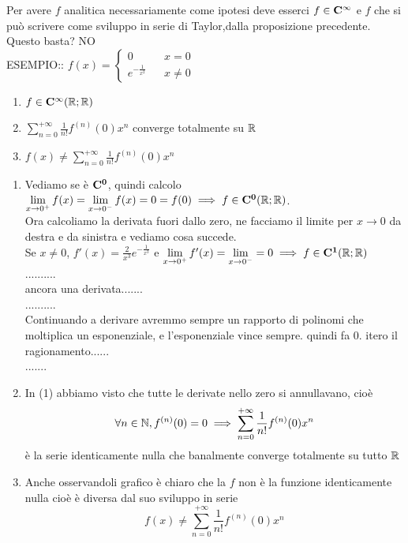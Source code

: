 Per avere $f$ analitica  necessariamente come ipotesi deve esserci $f\in \mathbf{C^{\infty}}$ e $f$ che si può scrivere come sviluppo in serie di Taylor,dalla proposizione precedente. Questo basta? NO\\
ESEMPIO:: $f(x)=\left\{\begin{matrix}0&& x=0\\e^{-\frac{1}{x^2}}&&x\ne 0\end{matrix}\right.$
\begin{center}
	\begin{tikzpicture}[scale=1]
	\end{tikzpicture}
\end{center}
\begin{enumerate}
	\item $f\in \mathbf{C^{\infty}}( \mathbb{R}; \mathbb{R})$
	\item $\sum\limits_{n=0}^{+\infty}\frac{1}{n!}f^{(n)}(0)x^n$ converge totalmente su $ \mathbb{R}$
	\item $f(x)\ne\sum\limits_{n=0}^{+\infty}\frac{1}{n!}f^{(n)}(0)x^n$
\end{enumerate}
\begin{enumerate}
	\item Vediamo se è $\mathbf{C^{0}}$, quindi calcolo $\lim\limits_{x\to 0^{+}}f(x)=\lim\limits_{x\to 0^{-}}f(x)=0=f(0)\implies f\in \mathbf{C^{0}}( \mathbb{R}; \mathbb{R})$.\\
	Ora calcoliamo la derivata fuori dallo zero, ne facciamo il limite per $x\to 0$ da destra e da sinistra e vediamo cosa succede.\\
	Se $x\ne 0$, $f'(x)=\frac{2}{x^3}e^{-\frac{1}{x^3}}$ e $\lim\limits_{x\to 0^{+}}f'(x)=\lim\limits_{x\to 0^{-}} = 0 \implies f\in \mathbf{C^{1}}( \mathbb{R}; \mathbb{R})$\\
	..........\\
	ancora una derivata.......\\
	..........\\
	Continuando a derivare  avremmo sempre un rapporto di polinomi che moltiplica un esponenziale, e l'esponenziale vince sempre. quindi fa $0$.
	itero il ragionamento......\\
	.......\\
	\item In (1) abbiamo visto  che tutte le derivate nello zero si annullavano, cioè
	\[\forall n\in\mathbb{N}, f^{(n)}(0)=0 \implies \sum\limits_{n=0}^{+\infty}\frac{1}{n!}f^{(n)}(0)x^n\]
	è la serie identicamente nulla  che banalmente converge totalmente su tutto $ \mathbb{R}$
	\item Anche osservandoli grafico è chiaro che la $f$ non è la funzione identicamente nulla cioè è diversa dal suo sviluppo in serie
	\[f(x)\ne\sum\limits_{n=0}^{+\infty}\frac{1}{n!}f^{(n)}(0)x^n\]
\end{enumerate}
